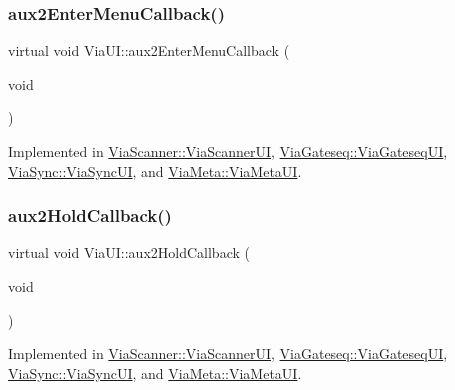 \mbox{\label{class_via_u_i_a1f51fc259471364f91bd0a1592824dab}} 
\subsubsection{\texorpdfstring{aux2\+Enter\+Menu\+Callback()}{aux2EnterMenuCallback()}}
{\footnotesize\ttfamily virtual void Via\+U\+I\+::aux2\+Enter\+Menu\+Callback (\begin{DoxyParamCaption}\item[{void}]{ }\end{DoxyParamCaption})\hspace{0.3cm}{\ttfamily [pure virtual]}}



Implemented in \mbox{\hyperlink{class_via_scanner_1_1_via_scanner_u_i_a5173aaf7222a059fa7d3a4b32f6fb275}{Via\+Scanner\+::\+Via\+Scanner\+UI}}, \mbox{\hyperlink{class_via_gateseq_1_1_via_gateseq_u_i_a3f3270689385b4ba7449599538aafc59}{Via\+Gateseq\+::\+Via\+Gateseq\+UI}}, \mbox{\hyperlink{class_via_sync_1_1_via_sync_u_i_a8af905460e4d9b91420fa557be0baeae}{Via\+Sync\+::\+Via\+Sync\+UI}}, and \mbox{\hyperlink{class_via_meta_1_1_via_meta_u_i_a31e89fca82851581b9ad7161cd81c6c0}{Via\+Meta\+::\+Via\+Meta\+UI}}.

\mbox{\label{class_via_u_i_a42545b69c2bbbb036f633140fd8007d6}} 
\subsubsection{\texorpdfstring{aux2\+Hold\+Callback()}{aux2HoldCallback()}}
{\footnotesize\ttfamily virtual void Via\+U\+I\+::aux2\+Hold\+Callback (\begin{DoxyParamCaption}\item[{void}]{ }\end{DoxyParamCaption})\hspace{0.3cm}{\ttfamily [pure virtual]}}



Implemented in \mbox{\hyperlink{class_via_scanner_1_1_via_scanner_u_i_a929ba662a65fd62f9c5b122accad48a4}{Via\+Scanner\+::\+Via\+Scanner\+UI}}, \mbox{\hyperlink{class_via_gateseq_1_1_via_gateseq_u_i_a825cc56cdbeffd7eee887e8f189cb35d}{Via\+Gateseq\+::\+Via\+Gateseq\+UI}}, \mbox{\hyperlink{class_via_sync_1_1_via_sync_u_i_af692a47db686fac2e929549217452258}{Via\+Sync\+::\+Via\+Sync\+UI}}, and \mbox{\hyperlink{class_via_meta_1_1_via_meta_u_i_a19cac5da8e89446d5ee2a2c889a6c555}{Via\+Meta\+::\+Via\+Meta\+UI}}.

